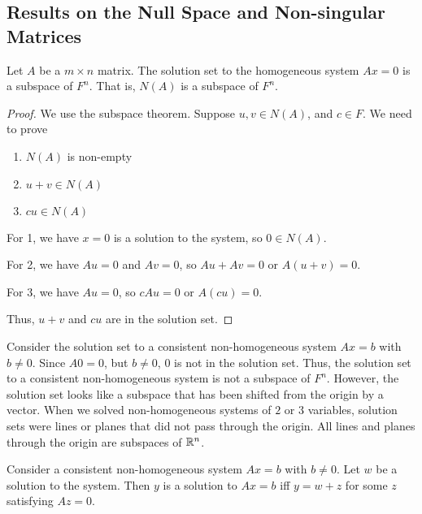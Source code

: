 \documentclass{article}
\begin{document}
\subsection{Results on the Null Space and Non-singular Matrices}
\begin{theorem}
  Let $A$ be a $m \times n$ matrix. The solution set to the homogeneous system $Ax = 0$ is a subspace of $F^n$. That is, $N(A)$ is a subspace of $F^n$.
\end{theorem}
\begin{proof}
  We use the subspace theorem. Suppose $u, v \in N(A)$, and $c \in F$. We need to prove
  \begin{enumerate}
    \item $N(A)$ is non-empty
    \item $u + v \in N(A)$
    \item $cu \in N(A)$
  \end{enumerate}
  For 1, we have $x = 0$ is a solution to the system, so $0 \in N(A)$.

  For 2, we have $Au = 0$ and $Av = 0$, so $Au + Av = 0$ or $A(u+v) = 0$.

  For 3, we have $Au = 0$, so $cAu = 0$ or $A(cu) = 0$.

  Thus, $u + v$ and $cu$ are in the solution set.
\end{proof}
\begin{remark}
  Consider the solution set to a consistent non-homogeneous system $Ax = b$ with $b \not = 0$. Since $A0 = 0$, but $b \not = 0$, $0$ is not in the solution set. Thus, the solution set to a consistent non-homogeneous system is not a subspace of $F^n$. However, the solution set looks like a subspace that has been shifted from the origin by a vector. When we solved non-homogeneous systems of $2$ or $3$ variables, solution sets were lines or planes that did not pass through the origin. All lines and planes through the origin are subspaces of $\mathbb{R}^n$.
\end{remark}
\begin{theorem}
  Consider a consistent non-homogeneous system $Ax = b$ with $b \not = 0$. Let $w$ be a solution to the system. Then $y$ is a solution to $Ax = b$ iff $y = w + z$ for some $z$ satisfying $Az = 0$.
\end{theorem}
\end{document}
